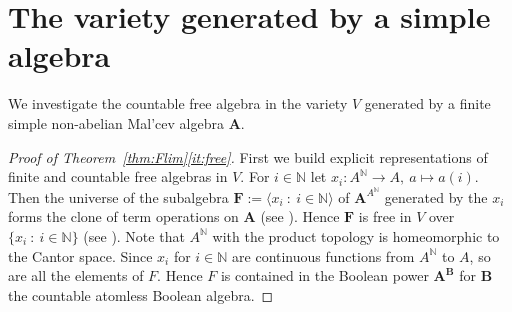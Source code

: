 \documentclass[12pt,a4paper,reqno]{amsart}
\numberwithin{equation}{section}
\theoremstyle{plain}
\theoremstyle{definition}
\newcommand{\A}{\mathbf{A}}
\newcommand{\B}{\mathbf{B}}
\newcommand{\F}{\mathbf{F}}
\newcommand{\N}{\mathbb{N}}
\newcommand{\st}{\: :\:}
\begin{document}
\section{The variety generated by a simple algebra} \label{sec:variety}

 
We investigate the countable free algebra in the variety $V$ generated by a finite simple non-abelian
 Mal'cev algebra $\A$.

 \begin{proof}[Proof of Theorem~\ref{thm:Flim}\eqref{it:free}]
 First we build explicit representations of finite and countable free algebras in $V$.
 For  $i\in \N$ let $x_i\colon A^\N\to A,\ a\mapsto a(i)$. 
 Then the universe of the subalgebra $\F := \langle x_i \st i\in \N \rangle$ of  $\A^{A^\N}$ generated by the $x_i$
  forms the clone of term operations on $\A$
 (see \cite[Section 4.1]{MMT:ALV1}). Hence $\F$ is free in $V$ over $\{x_i\st i\in \N\}$ (see \cite[Section 4.11]{MMT:ALV1}).
 Note that $A^\N$ with the product topology is homeomorphic to the Cantor space.
 Since $x_i$ for $i\in\N$ are continuous functions from $A^\N$ to $A$, so are all the elements of $F$.
 Hence $F$ is contained in the Boolean power $\A^\B$ for $\B$ the countable atomless Boolean algebra.



\end{proof}
\end{document}
